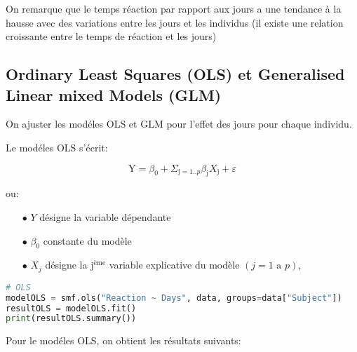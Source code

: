 On remarque que le temps réaction par rapport aux jours a une tendance à la hausse avec des variations entre les jours et les individus (il existe une relation croissante  entre le temps de réaction et les jours)

\newpage

\subsection{Ordinary Least Squares (OLS) et Generalised Linear mixed Models (GLM)}

On ajuster les modéles OLS et GLM pour l'effet des jours pour chaque individu.

Le modéles OLS s'écrit:

$$
\mathrm{Y}=\beta_{0}+\Sigma_{\mathrm{j}=1 . . p} \beta_{\mathrm{j}} X_{\mathrm{j}}+\varepsilon
$$

ou:

\begin{itemize}
    \item[$\bullet$] $Y$ désigne la variable dépendante
    \item[$\bullet$] $\beta_0$ constante du modèle
    \item[$\bullet$] $X_j$ désigne la $\text{j}^{\text{ème}}$ variable explicative du modèle $(j= 1 \text{ a } p)$,
\end{itemize}

\begin{lstlisting}[language=Python]
# OLS
modelOLS = smf.ols("Reaction ~ Days", data, groups=data["Subject"])
resultOLS = modelOLS.fit()
print(resultOLS.summary())
\end{lstlisting}

Pour le modéles OLS, on obtient les résultats suivants:

